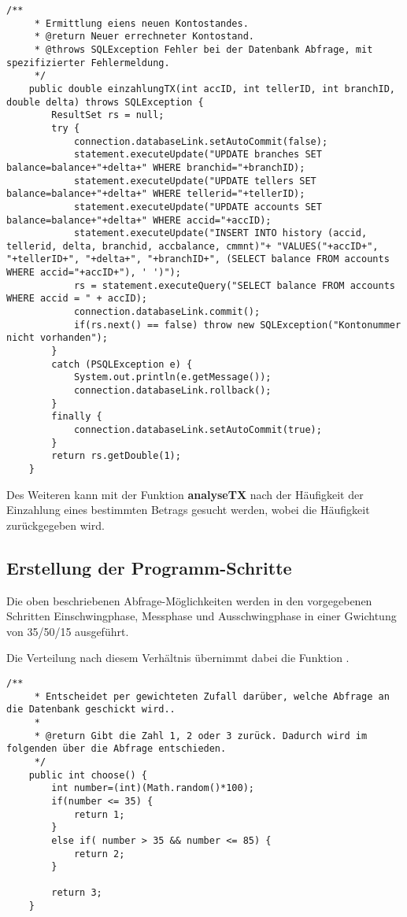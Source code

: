 \begin{lstlisting}[caption={einzahlungsTX-Funktion in TXHandler.java}]
	/**
	 * Ermittlung eiens neuen Kontostandes.
	 * @return Neuer errechneter Kontostand.
	 * @throws SQLException Fehler bei der Datenbank Abfrage, mit spezifizierter Fehlermeldung.
	 */
	public double einzahlungTX(int accID, int tellerID, int branchID, double delta) throws SQLException	{
		ResultSet rs = null;
		try {
			connection.databaseLink.setAutoCommit(false);
			statement.executeUpdate("UPDATE branches SET balance=balance+"+delta+" WHERE branchid="+branchID);
			statement.executeUpdate("UPDATE tellers SET balance=balance+"+delta+" WHERE tellerid="+tellerID);
			statement.executeUpdate("UPDATE accounts SET balance=balance+"+delta+" WHERE accid="+accID);
			statement.executeUpdate("INSERT INTO history (accid, tellerid, delta, branchid, accbalance, cmmnt)"+ "VALUES("+accID+", "+tellerID+", "+delta+", "+branchID+", (SELECT balance FROM accounts WHERE accid="+accID+"), ' ')");
			rs = statement.executeQuery("SELECT balance FROM accounts WHERE accid = " + accID);
			connection.databaseLink.commit();
			if(rs.next() == false) throw new SQLException("Kontonummer nicht vorhanden");
		}
		catch (PSQLException e) {
			System.out.println(e.getMessage());
			connection.databaseLink.rollback();
		}
		finally {
			connection.databaseLink.setAutoCommit(true);
		}
		return rs.getDouble(1);
	}
\end{lstlisting}
 

Des Weiteren kann mit der Funktion \textbf{analyseTX} nach der Häufigkeit der
Einzahlung eines bestimmten Betrags gesucht werden, wobei die Häufigkeit zurückgegeben wird.

\subsection{Erstellung der Programm-Schritte}
Die oben beschriebenen Abfrage-Möglichkeiten werden in den vorgegebenen
Schritten Einschwingphase, Messphase und Ausschwingphase in einer Gwichtung von
35/50/15 ausgeführt.

Die Verteilung nach diesem Verhältnis übernimmt dabei die Funktion
.

\begin{lstlisting}[caption={choose-Funktion in ProgramStage.java}]
	/**
	 * Entscheidet per gewichteten Zufall darüber, welche Abfrage an die Datenbank geschickt wird..
	 * 
	 * @return Gibt die Zahl 1, 2 oder 3 zurück. Dadurch wird im folgenden über die Abfrage entschieden.
	 */
	public int choose() {
		int number=(int)(Math.random()*100);
		if(number <= 35) {
			return 1;
		}
		else if( number > 35 && number <= 85) {
			return 2;
		}
		
		return 3;
	}
\end{lstlisting}



